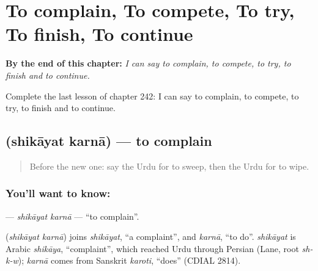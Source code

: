 
\chapter{To complain, To compete, To try, To finish, To continue}
\label{ch:ur-to-complain-to-compete-to-try-to-finish-to-continue}

\begin{chapteropening}
\textbf{By the end of this chapter:} \emph{I can say to complain, to compete, to try, to finish and to continue.}

Complete the last lesson of chapter 242: I can say to complain, to compete, to try, to finish and to continue.
\end{chapteropening}

\section[\texorpdfstring{\ur{شکایت} \ur{کرنا} (shikāyat karnā)}{شکایت کرنا (shikāyat karnā)}]{  (shikāyat karnā) — to complain}

\label{lesson:UR-C242-shikayat-karna}



\begin{quote}
Before the new one: say the Urdu for to sweep, then the Urdu for to wipe.
\end{quote}

\subsection*{You'll want to know:  }
\textbf{ } — \emph{shikāyat karnā} — \textquotedblleft{}to complain\textquotedblright{}.

\begin{cousinweb}
\textbf{ } (\emph{shikāyat karnā}) joins \emph{shikāyat}, \textquotedblleft{}a complaint\textquotedblright{}, and \emph{karnā}, \textquotedblleft{}to do\textquotedblright{}. \emph{shikāyat} is Arabic \emph{shikāya}, \textquotedblleft{}complaint\textquotedblright{}, which reached Urdu through Persian (Lane, root \emph{sh-k-w}); \emph{karnā} comes from Sanskrit \emph{karoti}, \textquotedblleft{}does\textquotedblright{} (CDIAL 2814).
\end{cousinweb}

